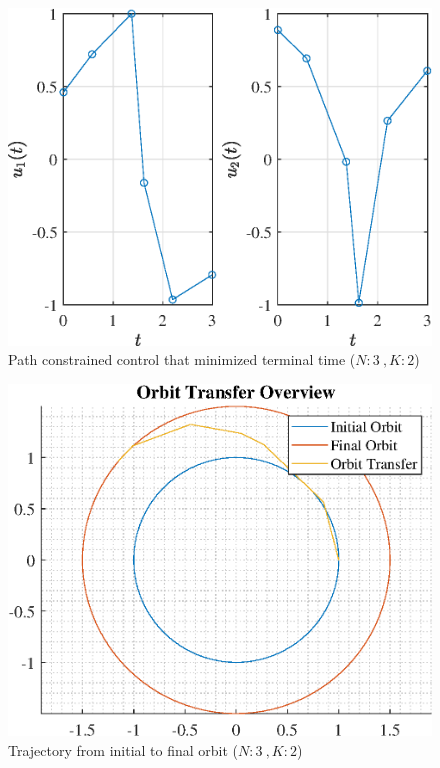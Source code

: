\documentclass[]{article}
\begin{document}
\begin{figure}
	\centering
	\includegraphics[scale=0.75]{path_N3_K2_C3_tf.eps}
	\caption{Path constrained control that minimized terminal time (\(N:3\ , K:2\))}
	\label{fig:path_N3_K2_C3_tf}
\end{figure}
\begin{figure}
	\centering
	\includegraphics[scale=0.75]{orbit_N3_K2_C3_tf.eps}
	\caption{Trajectory from initial to final orbit (\(N:3\ , K:2\))}
	\label{fig:orbit_N3_K2_C3_tf}
\end{figure}
\end{document}
